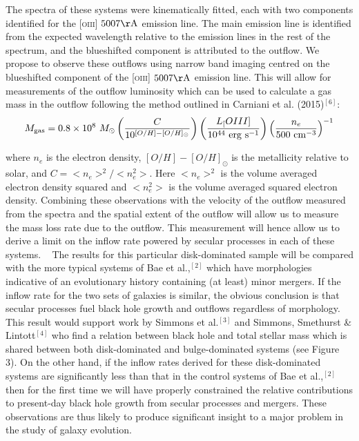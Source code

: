 \documentclass[12pt]{article}
\begin{document}
The spectra of these systems were kinematically fitted, each with two components identified for the \textsc{[oiii]} $5007\rm{\AA}$ emission line. The main emission line is identified from the expected wavelength relative to the emission lines in the rest of the spectrum, and the blueshifted component is attributed to the outflow. We propose to observe these outflows using narrow band imaging centred on the blueshifted component of the \textsc{[oiii]} $5007\rm{\AA}$ emission line. This will allow for measurements of the outflow luminosity which can be used to calculate a gas mass in the outflow following the method outlined in Carniani et al. (2015)$^{[6]}$:
\begin{equation}
M_{\rm{gas}} = 0.8 \times 10^8~M_{\odot} \left( \frac{C}{10^{[O/H] - [O/H]_{\odot}}} \right) \left( \frac{L_[OIII]}{10^{44}~\rm{erg}~\rm{s}^{-1}} \right) \left( \frac{n_e}{500~\rm{cm}^{-3}} \right)^{-1}
\end{equation}

where $n_e$ is the electron density, $[O/H] - [O/H]_{\odot}$ is the metallicity relative to solar, and $C = <n_e>^2 / <n_e^2>$. Here $<n_e>^2$ is the volume averaged electron density squared and $<n_e^2>$ is the volume averaged squared electron density. Combining these observations with the velocity of the outflow measured from the spectra and the spatial extent of the outflow will allow us to measure the mass loss rate due to the outflow. This measurement will hence allow us to derive a limit on the inflow rate powered by secular processes in each of these systems. 
\vspace{0.25em}
 
The results for this particular disk-dominated sample will be compared with the more typical systems of Bae et al.,$^{[2]}$ which have morphologies indicative of an evolutionary history containing (at least) minor mergers. If the inflow rate for the two sets of galaxies is similar, the obvious conclusion is that secular processes fuel black hole growth and outflows regardless of morphology. This result would support work by Simmons et al.$^{[3]}$ and Simmons, Smethurst \& Lintott$^{[4]}$ who find a relation between black hole and total stellar mass which is shared between both disk-dominated and bulge-dominated systems (see Figure 3). On the other hand, if the inflow rates derived for these disk-dominated systems are significantly less than that in the control systems of Bae et al.,$^{[2]}$ then for the first time we will have properly constrained the relative contributions to present-day black hole growth from secular processes and mergers. These observations are thus likely to produce significant insight to a major problem in the study of galaxy evolution. 
\vspace{1.5em}
\end{document}
